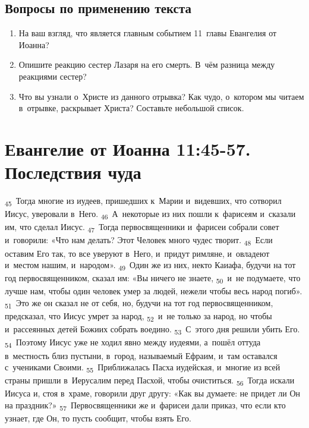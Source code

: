 \documentclass[a4paper,12pt]{article}
\begin{document}
\subsection*{Вопросы по применению текста} 
\begin{enumerate}
    \item На ваш взгляд, что является главным событием 11~главы Евангелия от Иоанна? 
    
    \myline
    
    \myline
    \item Опишите реакцию сестер Лазаря на его смерть. В~чём разница между реакциями сестер? 
    
    \myline
    
    \myline
    \item Что вы узнали о~Христе из данного отрывка? Как чудо, о~котором мы читаем в~отрывке, раскрывает Христа? Составьте небольшой список.
    
    \myline
    
    \myline
\end{enumerate}



\section{Евангелие от Иоанна 11:45-57. Последствия чуда}

\textsubscript{45}~Тогда многие из иудеев, пришедших к~Марии и~видевших, что сотворил Иисус, уверовали в~Него. \textsubscript{46}~А~некоторые из них пошли к~фарисеям и~сказали им, что сделал Иисус. \textsubscript{47}~Тогда первосвященники и~фарисеи собрали совет и~говорили: «Что нам делать? Этот Человек много чудес творит. \textsubscript{48}~Если оставим Его так, то все уверуют в~Него, и~придут римляне, и~овладеют и~местом нашим, и~народом». \textsubscript{49}~Один же из них, некто Каиафа, будучи на тот год первосвященником, сказал им: «Вы ничего не знаете, \textsubscript{50}~и~не подумаете, что лучше нам, чтобы один человек умер за людей, нежели чтобы весь народ погиб». \textsubscript{51}~Это же он сказал не от себя, но, будучи на тот год первосвященником, предсказал, что Иисус умрет за народ, \textsubscript{52}~и~не только за народ, но чтобы и~рассеянных детей Божиих собрать воедино. \textsubscript{53}~С~этого дня решили убить Его. \textsubscript{54}~Поэтому Иисус уже не ходил явно между иудеями, а~пошёл оттуда в~местность близ пустыни, в~город, называемый Ефраим, и~там оставался с~учениками Своими. \textsubscript{55}~Приближалась Пасха иудейская, и~многие из всей страны пришли в~Иерусалим перед Пасхой, чтобы очиститься. \textsubscript{56}~Тогда искали Иисуса и, стоя в~храме, говорили друг другу: «Как вы думаете: не придет ли Он на праздник?» \textsubscript{57}~Первосвященники же и~фарисеи дали приказ, что если кто узнает, где Он, то пусть сообщит, чтобы взять Его. 
\end{document}
